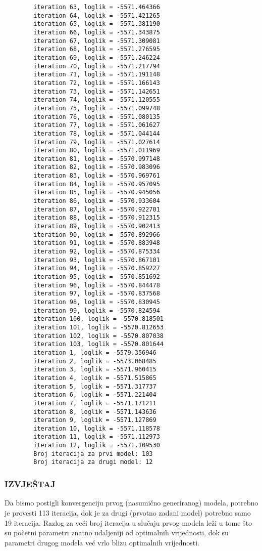 \documentclass[12pt]{article}
\begin{document}
\begin{verbatim}
		iteration 63, loglik = -5571.464366
		iteration 64, loglik = -5571.421265
		iteration 65, loglik = -5571.381190
		iteration 66, loglik = -5571.343875
		iteration 67, loglik = -5571.309081
		iteration 68, loglik = -5571.276595
		iteration 69, loglik = -5571.246224
		iteration 70, loglik = -5571.217794
		iteration 71, loglik = -5571.191148
		iteration 72, loglik = -5571.166143
		iteration 73, loglik = -5571.142651
		iteration 74, loglik = -5571.120555
		iteration 75, loglik = -5571.099748
		iteration 76, loglik = -5571.080135
		iteration 77, loglik = -5571.061627
		iteration 78, loglik = -5571.044144
		iteration 79, loglik = -5571.027614
		iteration 80, loglik = -5571.011969
		iteration 81, loglik = -5570.997148
		iteration 82, loglik = -5570.983096
		iteration 83, loglik = -5570.969761
		iteration 84, loglik = -5570.957095
		iteration 85, loglik = -5570.945056
		iteration 86, loglik = -5570.933604
		iteration 87, loglik = -5570.922701
		iteration 88, loglik = -5570.912315
		iteration 89, loglik = -5570.902413
		iteration 90, loglik = -5570.892966
		iteration 91, loglik = -5570.883948
		iteration 92, loglik = -5570.875334
		iteration 93, loglik = -5570.867101
		iteration 94, loglik = -5570.859227
		iteration 95, loglik = -5570.851692
		iteration 96, loglik = -5570.844478
		iteration 97, loglik = -5570.837568
		iteration 98, loglik = -5570.830945
		iteration 99, loglik = -5570.824594
		iteration 100, loglik = -5570.818501
		iteration 101, loglik = -5570.812653
		iteration 102, loglik = -5570.807038
		iteration 103, loglik = -5570.801644
		iteration 1, loglik = -5579.356946
		iteration 2, loglik = -5573.068485
		iteration 3, loglik = -5571.960415
		iteration 4, loglik = -5571.515865
		iteration 5, loglik = -5571.317737
		iteration 6, loglik = -5571.221404
		iteration 7, loglik = -5571.171211
		iteration 8, loglik = -5571.143636
		iteration 9, loglik = -5571.127869
		iteration 10, loglik = -5571.118578
		iteration 11, loglik = -5571.112973
		iteration 12, loglik = -5571.109530
		Broj iteracija za prvi model: 103
		Broj iteracija za drugi model: 12
	\end{verbatim}
	
	\subsubsection*{IZVJEŠTAJ}
	Da bismo postigli konvergenciju prvog (nasumično generiranog) modela, potrebno je provesti 113 iteracija, dok je za drugi (prvotno zadani model) potrebno samo 19 iteracija. Razlog za veći broj iteracija u slučaju prvog modela leži u tome što su početni parametri znatno udaljeniji od optimalnih vrijednosti, dok su parametri drugog modela već vrlo blizu optimalnih vrijednosti.
	
\end{document}
